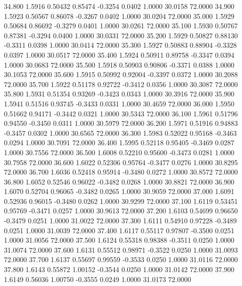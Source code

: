   34.800   1.5916   0.50432   0.85474  -0.3254   0.0402   1.0000  30.0158  72.0000
  34.900   1.5923   0.50567   0.86078  -0.3267   0.0402   1.0000  30.0204  72.0000
  35.000   1.5929   0.50684   0.86692  -0.3279   0.0401   1.0000  30.0261  72.0000
  35.100   1.5930   0.50767   0.87381  -0.3294   0.0400   1.0000  30.0331  72.0000
  35.200   1.5929   0.50827   0.88130  -0.3311   0.0398   1.0000  30.0414  72.0000
  35.300   1.5927   0.50883   0.88904  -0.3328   0.0397   1.0000  30.0517  72.0000
  35.400   1.5924   0.50911   0.89758  -0.3347   0.0394   1.0000  30.0683  72.0000
  35.500   1.5918   0.50903   0.90806  -0.3371   0.0388   1.0000  30.1053  72.0000
  35.600   1.5915   0.50992   0.92004  -0.3397   0.0372   1.0000  30.2088  72.0000
  35.700   1.5922   0.51178   0.92722  -0.3412   0.0356   1.0000  30.3087  72.0000
  35.800   1.5931   0.51354   0.93269  -0.3423   0.0343   1.0000  30.3916  72.0000
  35.900   1.5941   0.51516   0.93745  -0.3433   0.0331   1.0000  30.4659  72.0000
  36.000   1.5950   0.51662   0.94171  -0.3442   0.0321   1.0000  30.5343  72.0000
  36.100   1.5961   0.51796   0.94550  -0.3450   0.0311   1.0000  30.5979  72.0000
  36.200   1.5971   0.51916   0.94883  -0.3457   0.0302   1.0000  30.6565  72.0000
  36.300   1.5983   0.52022   0.95168  -0.3463   0.0294   1.0000  30.7091  72.0000
  36.400   1.5995   0.52118   0.95405  -0.3469   0.0287   1.0000  30.7556  72.0000
  36.500   1.6008   0.52210   0.95600  -0.3473   0.0281   1.0000  30.7958  72.0000
  36.600   1.6022   0.52306   0.95764  -0.3477   0.0276   1.0000  30.8295  72.0000
  36.700   1.6036   0.52418   0.95914  -0.3480   0.0272   1.0000  30.8572  72.0000
  36.800   1.6052   0.52546   0.96022  -0.3482   0.0268   1.0000  30.8821  72.0000
  36.900   1.6070   0.52704   0.96065  -0.3482   0.0265   1.0000  30.9059  72.0000
  37.000   1.6091   0.52936   0.96015  -0.3480   0.0262   1.0000  30.9299  72.0000
  37.100   1.6119   0.53451   0.95769  -0.3471   0.0257   1.0000  30.9613  72.0000
  37.200   1.6103   0.54699   0.96650  -0.3479   0.0251   1.0000  31.0022  72.0000
  37.300   1.6111   0.54910   0.97228  -0.3489   0.0251   1.0000  31.0039  72.0000
  37.400   1.6117   0.55117   0.97807  -0.3500   0.0251   1.0000  31.0056  72.0000
  37.500   1.6124   0.55318   0.98388  -0.3511   0.0250   1.0000  31.0074  72.0000
  37.600   1.6131   0.55512   0.98971  -0.3522   0.0250   1.0000  31.0093  72.0000
  37.700   1.6137   0.55697   0.99559  -0.3533   0.0250   1.0000  31.0116  72.0000
  37.800   1.6143   0.55872   1.00152  -0.3544   0.0250   1.0000  31.0142  72.0000
  37.900   1.6149   0.56036   1.00750  -0.3555   0.0249   1.0000  31.0173  72.0000
